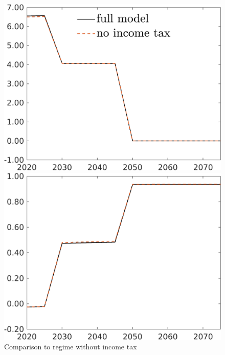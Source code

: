 \begin{figure}[h!!]
	\centering
	\caption{Comparison to regime without income tax }\label{fig:Compno_taul_BN0}
	\begin{minipage}[]{0.32\textwidth}
		\includegraphics[width=1\textwidth]{../../codding_model/own_basedOnFried/optimalPol_elastS_DisuSci/figures/all_1705/comp_notaul_OPT_T_NoTaus_Emnet_spillover0_sep1_BN0_ineq0_etaa0.79_lgd1.png}
	\end{minipage}
	\begin{minipage}[]{0.32\textwidth}
		\includegraphics[width=1\textwidth]{../../codding_model/own_basedOnFried/optimalPol_elastS_DisuSci/figures/all_1705/comp_notaul_OPT_T_NoTaus_tauf_spillover0_sep1_BN0_ineq0_etaa0.79.png}

\end{minipage}
\end{figure}
